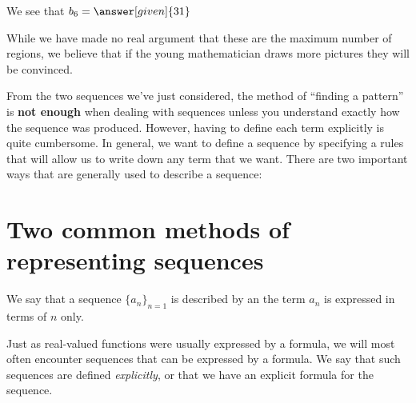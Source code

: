\documentclass{ximera}
\begin{document}
\begin{example}
\begin{explanation}
\begin{itemize}
 We see that $b_6 = \answer[given]{31}$
    \end{itemize}
    While we have made no real argument that these are the maximum
    number of regions, we believe that if the young mathematician draws
    more pictures they will be convinced.
  \end{explanation}
\end{example}


From the two sequences we've just considered, the method of ``finding a pattern'' is \textbf{not enough} when dealing with sequences unless you understand exactly how the sequence was produced.   However, having to define each term explicitly is quite cumbersome.  In general, we want to define a sequence by specifying a rules that will allow us to write down any term that we want.  There are two important ways that are generally used to describe a sequence:

\section{Two common methods of representing sequences}

\begin{definition}
We say that a sequence $\{a_n\}_{n=1}$ is described by an  the term $a_n$ is expressed in terms of $n$ only.
\end{definition}

Just as real-valued functions were usually expressed by a formula, we
will most often encounter sequences that can be expressed by a
formula.  We say that such sequences are defined \textit{explicitly}, 
or that we have an explicit formula for the sequence.
\end{document}
